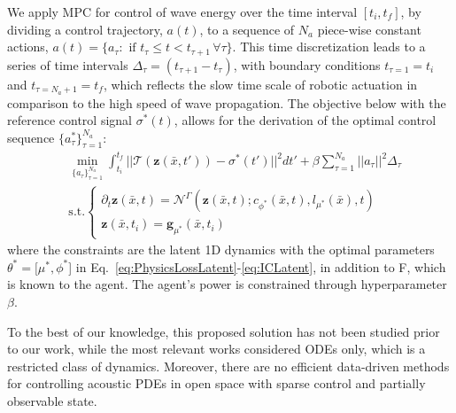 We apply MPC \cite{bakaravc2018_random_shooting,RICHALET1978_MPC, MORARI1988_MPC} for control of wave energy over the time interval $[t_i, t_f]$, by dividing a control trajectory, $a(t)$, to a sequence of $N_a$ piece-wise constant actions, $a(t)=\{a_{\tau} : \mbox{ if }t_\tau\le t < t_{\tau+1}\,\forall \tau \}$. This time discretization leads to a series of time intervals $\Delta_{\tau} = (t_{\tau+1}-t_{\tau})$, with boundary conditions $t_{\tau = 1} = t_i$ and $t_{\tau = N_a + 1} = t_f$, which reflects the slow time scale of robotic actuation in comparison to the high speed of wave propagation. The objective below with the reference control signal $\sigma^*(t)$, allows for the derivation of the optimal control sequence $\{a^*_{\tau}\}_{\tau=1}^{N_a}$:   
\begin{align}
 &\underset{\{a_{\tau}\}_{\tau=1}^{N_a}}{\min} \int_{t_i}^{t_f}||\mathcal{T}(\mathbf{z}(\bar{x}, t')) - \sigma^*(t')||^2dt'
    + \beta\sum_{\tau=1}^{N_a}||a_{\tau}||^2\Delta_{\tau}    \label{eq:latent_control_cost}\\
    &\mbox{s.t.} \begin{cases}
        \partial_{t}\mathbf{z}(\bar{x}, t) = \mathcal{N}^\Gamma(\mathbf{z}(\bar{x}, t); c_{\phi^*}(\bar{x}, t), l_{\mu^*}(\bar{x}), t)\\
        \mathbf{z}(\bar{x}, t_i) = \mathbf{g}_{\mu^*}(\bar{x}, t_i)
    \end{cases}
\end{align}
where the constraints are the latent 1D dynamics with the optimal parameters $\theta^* = [\mu^*, \phi^*$] in Eq.~\eqref{eq:PhysicsLossLatent}-\eqref{eq:ICLatent}, in addition to F, which is known to the agent. The agent's power is constrained through hyperparameter $\beta$.


To the best of our knowledge, this proposed solution has not been studied prior to our work, while the most relevant works \cite{ericaislanantonelo_2022_physicsinformed, nicodemus_2022_physicsinformed} considered ODEs only, which is a restricted class of dynamics. Moreover, there are no efficient data-driven methods for controlling acoustic PDEs in open space with sparse control and partially observable state.
